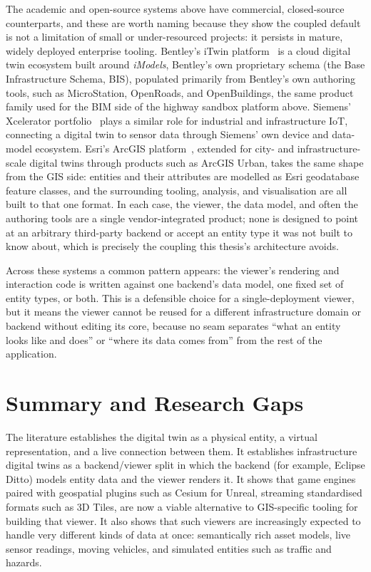 The academic and open-source systems above have commercial, closed-source counterparts, and these are worth naming because they show the coupled default is not a limitation of small or under-resourced projects: it persists in mature, widely deployed enterprise tooling. Bentley's iTwin platform~\cite{bentleyitwin} is a cloud digital twin ecosystem built around \emph{iModels}, Bentley's own proprietary schema (the Base Infrastructure Schema, BIS), populated primarily from Bentley's own authoring tools, such as MicroStation, OpenRoads, and OpenBuildings, the same product family used for the BIM side of the highway sandbox platform above. Siemens' Xcelerator portfolio~\cite{siemensxcelerator} plays a similar role for industrial and infrastructure IoT, connecting a digital twin to sensor data through Siemens' own device and data-model ecosystem. Esri's ArcGIS platform~\cite{esriarcgis}, extended for city- and infrastructure-scale digital twins through products such as ArcGIS Urban, takes the same shape from the GIS side: entities and their attributes are modelled as Esri geodatabase feature classes, and the surrounding tooling, analysis, and visualisation are all built to that one format. In each case, the viewer, the data model, and often the authoring tools are a single vendor-integrated product; none is designed to point at an arbitrary third-party backend or accept an entity type it was not built to know about, which is precisely the coupling this thesis's architecture avoids.

Across these systems a common pattern appears: the viewer's rendering and interaction code is written against one backend's data model, one fixed set of entity types, or both. This is a defensible choice for a single-deployment viewer, but it means the viewer cannot be reused for a different infrastructure domain or backend without editing its core, because no seam separates ``what an entity looks like and does'' or ``where its data comes from'' from the rest of the application.

\section{Summary and Research Gaps}
\label{sec:research-gaps}

The literature establishes the digital twin as a physical entity, a virtual representation, and a live connection between them. It establishes infrastructure digital twins as a backend/viewer split in which the backend (for example, Eclipse Ditto) models entity data and the viewer renders it. It shows that game engines paired with geospatial plugins such as Cesium for Unreal, streaming standardised formats such as 3D Tiles, are now a viable alternative to GIS-specific tooling for building that viewer. It also shows that such viewers are increasingly expected to handle very different kinds of data at once: semantically rich asset models, live sensor readings, moving vehicles, and simulated entities such as traffic and hazards.

